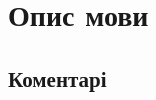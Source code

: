 \documentclass[main.tex]{subfiles}
\begin{document}
\section{Опис мови}
\subsection{Коментарі}


\end{document}
